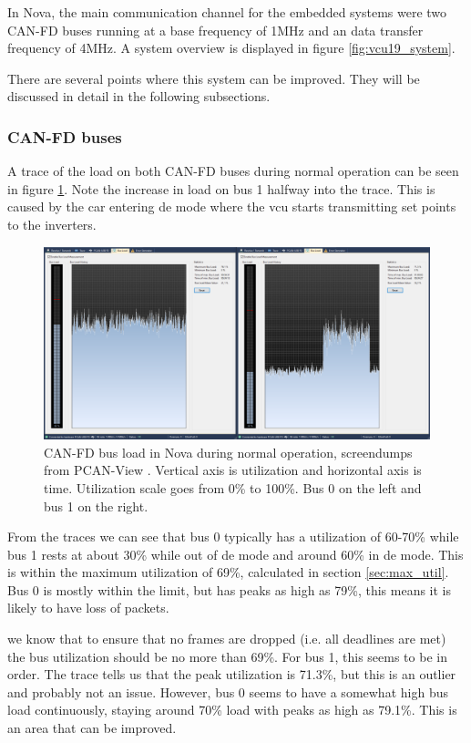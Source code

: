 In Nova, the main communication channel for the embedded systems were two CAN-FD buses running at a base frequency of 1MHz and an data transfer frequency of 4MHz. A system overview is displayed in figure \ref{fig:vcu19_system}.

There are several points where this system can be improved. They will be discussed in detail in the following subsections.

\subsubsection{CAN-FD buses}

A trace of the load on both CAN-FD buses during normal operation can be seen in figure \ref{fig:canfd_load}. Note the increase in load on bus 1 halfway into the trace. This is caused by the car entering \acrfull{de} mode where the \acrshort{vcu} starts transmitting set points to the inverters. 

\begin{figure}[H]
    \centering
    \includegraphics[width=\textwidth]{media/canfd-load.png}
    \caption{CAN-FD bus load in Nova during normal operation, screendumps from PCAN-View \cite{pcanview}. Vertical axis is utilization and horizontal axis is time. Utilization scale goes from 0\% to 100\%. Bus 0 on the left and bus 1 on the right.}
    \label{fig:canfd_load}
\end{figure}

From the traces we can see that bus 0 typically has a utilization of 60-70\% while bus 1 rests at about 30\% while out of \acrshort{de} mode and around 60\% in \acrshort{de} mode. This is within the maximum utilization of 69\%, calculated in section \ref{sec:max_util}. Bus 0 is mostly within the limit, but has peaks as high as 79\%, this means it is likely to have loss of packets.

we know that to ensure that no frames are dropped (i.e. all deadlines are met) the bus utilization should be no more than 69\%. For bus 1, this seems to be in order. The trace tells us that the peak utilization is 71.3\%, but this is an outlier and probably not an issue. However, bus 0 seems to have a somewhat high bus load continuously, staying around 70\% load with peaks as high as 79.1\%. This is an area that can be improved.

